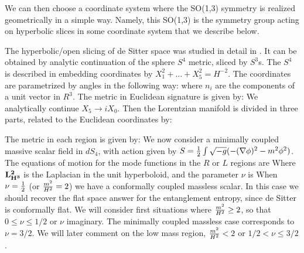 We can then choose a coordinate system where the SO(1,3) symmetry is  realized geometrically in
a simple way. Namely, this SO(1,3) is the symmetry group acting on
 hyperbolic slices in some coordinate system
that we describe below.



The hyperbolic/open slicing of  de Sitter
 space was studied in detail in . It can be obtained by analytic continuation of the sphere $S^4$ metric, sliced by $S^3$s. The $S^4$ is described in embedding coordinates by $X_1^2+...+X_5^2=H^{-2}$. The coordinates are parametrized by angles in the following way:
\eqn{}
where $n_i$ are the components of a unit vector in $R^3$.  The metric in Euclidean signature is given by:
\eqn{}
We analytically continue $X_5 \to i X_0$. Then the Lorentzian manifold is divided in three parts, related to the Euclidean coordinates by:
\eqn{}

The metric in each region is given by:
\eqn{}
We now consider a minimally coupled
massive scalar field in $dS_4$, with action given by $S=
{1 \over 2}\int \sqrt{-g} ( -(\nabla \phi)^2 - m^2 \phi^2)$. The equations of motion for the mode functions
in  the $R$ or $L$ regions are
\eqn{}
Where ${\bf L_{H^3}^2}$ is the Laplacian in the unit hyperboloid, and the parameter $\nu$ is
\eqn{}
When $\nu ={ 1 \over 2}$ (or ${ m^2 \over H^2}  = 2$) we have a conformally coupled massless scalar. In this
case we should recover the flat space answer for the entanglement entropy, since de Sitter is
conformally flat.
We will consider first situations where ${ m^2 \over H^2} \geq 2$, so that $0\le\nu\le1/2$ or $\nu$ imaginary.
 The minimally coupled massless case corresponds to $\nu= 3/2$. We will later comment on the low mass region,
${ m^2 \over H^2} < 2$ or  $1/2 < \nu \le 3/2$.

